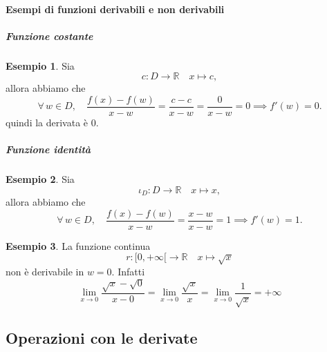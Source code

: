 \documentclass{article}
\theoremstyle{plain}
\theoremstyle{definition}
\newtheorem{exmp}{Esempio}[section]
\theoremstyle{remark}
\begin{document}
\vspace{10pt}

\paragraph{Esempi di funzioni derivabili e non derivabili}

\vspace{10pt}

\subparagraph{Funzione costante}
\begin{exmp}
    Sia 
    \[c:D\to\mathbb{R}\quad x\mapsto c,\]
    allora abbiamo che 
    \[\forall\, w\in D,\quad\dfrac{f(x)-f(w)}{x-w}=\dfrac{c-c}{x-w}=\dfrac{0}{x-w}=0\implies f'(w)=0.\] 
    quindi la derivata è $0$.
\end{exmp}

\vspace{10pt}

\subparagraph{Funzione identità}
\begin{exmp}
    Sia
    \[\iota_D:D\to\mathbb{R}\quad x\mapsto x,\]
    allora abbiamo che
    \[\forall\, w\in D,\quad\dfrac{f(x)-f(w)}{x-w}=\dfrac{x-w}{x-w}=1\implies f'(w)=1.\] 
\end{exmp}

\vspace{10pt}

\begin{exmp}
    La funzione continua 
    \[r:[0,+\infty[\to\mathbb{R}\quad x\mapsto \sqrt{x}\]
    non è derivabile in $w=0$.
    Infatti \[\lim_{x\to0}\dfrac{\sqrt{x}-\sqrt{0}}{x-0}=\lim_{x\to0}\dfrac{\sqrt{x}}{x}=\lim_{x\to0}\dfrac{1}{\sqrt{x}}=+\infty\]
\end{exmp}

\vspace{10pt}

\subsection{Operazioni con le derivate}

\vspace{10pt}
\end{document}
